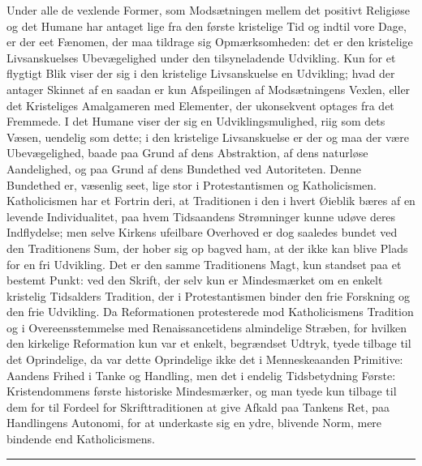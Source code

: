 \documentclass[12pt,a4paper,openany]{book}
\newcommand{\opage}[1]{\marginnote{\footnotesize\textit{[#1]}}}
\begin{document}
Under alle de vexlende Former, som Modsætningen
mellem det positivt Religiøse og det Humane har antaget
lige fra den første kristelige Tid og indtil vore Dage, er der
eet Fænomen, der maa tildrage sig Opmærksomheden: det er
den kristelige Livsanskuelses Ubevægelighed under den tilsyneladende
Udvikling. Kun for et flygtigt Blik viser der
sig i den kristelige Livsanskuelse en Udvikling; hvad der antager
Skinnet af en saadan er kun Afspeilingen af Modsætningens
Vexlen, eller det Kristeliges Amalgameren med
Elementer, der ukonsekvent optages fra det Fremmede. I
det Humane viser der sig en Udviklingsmulighed, riig som
dets Væsen, uendelig som dette; i den kristelige Livsanskuelse
er der og maa der være Ubevægelighed, baade paa Grund
af dens Abstraktion, af dens naturløse Aandelighed, og paa
Grund af dens Bundethed ved Autoriteten. Denne Bundethed
er, væsenlig seet, lige stor i Protestantismen og Katholicismen.
Katholicismen har et Fortrin deri, at Traditionen
i den i hvert Øieblik bæres af en levende Individualitet,
paa hvem Tidsaandens Strømninger kunne udøve deres
Indflydelse; men selve Kirkens ufeilbare Overhoved er dog
saaledes bundet ved den Traditionens Sum, der hober sig
\opage{295}op bagved ham, at der ikke kan blive Plads for en fri Udvikling.
Det er den samme Traditionens Magt, kun standset
paa et bestemt Punkt: ved den Skrift, der selv kun er
Mindesmærket om en enkelt kristelig Tidsalders Tradition,
der i Protestantismen binder den frie Forskning og den frie
Udvikling. Da Reformationen protesterede mod Katholicismens
Tradition og i Overeensstemmelse med Renaissancetidens
almindelige Stræben, for hvilken den kirkelige Reformation
kun var et enkelt, begrændset Udtryk, tyede tilbage
til det Oprindelige, da var dette Oprindelige ikke det i
Menneskeaanden Primitive: Aandens Frihed i Tanke og
Handling, men det i endelig Tidsbetydning Første: Kristendommens
første historiske Mindesmærker, og man tyede kun
tilbage til dem for til Fordeel for Skrifttraditionen at give
Afkald paa Tankens Ret, paa Handlingens Autonomi, for
at underkaste sig en ydre, blivende Norm, mere bindende end
Katholicismens.

\begin{center}\rule{1.8cm}{0.4pt}\end{center}
\end{document}

